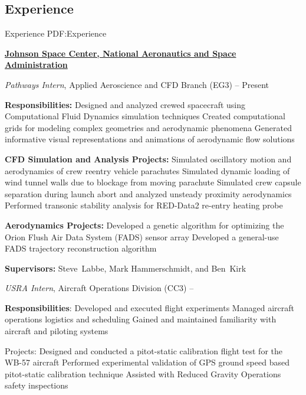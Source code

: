 \documentclass[letterpaper,MMMyyyy,nonstop]{simpleresumecv}
\begin{document}
\begin{body}
\section
{Experience}
{Experience}
{PDF:Experience}

\href{https://www.nasa.gov/centers/johnson/home/index.html}
{\textbf{Johnson Space Center,
National Aeronautics and Space Administration}}

\GapNoBreak
\BulletItem
\emph{Pathways Intern}, Applied Aeroscience and CFD Branch (EG3)
\hfill
{} --
Present
\begin{detail}
\SubItem
\textbf{Responsibilities:}
\SubBulletItem
Designed and analyzed crewed spacecraft using Computational Fluid Dynamics simulation techniques
\SubBulletItem
Created computational grids for modeling complex geometries and aerodynamic phenomena
\SubBulletItem
Generated informative visual representations and animations of aerodynamic flow solutions

\SubItem
\textbf{CFD Simulation and Analysis Projects:}
\SubBulletItem
Simulated oscillatory motion and aerodynamics of crew reentry vehicle parachutes
\SubBulletItem
Simulated dynamic loading of wind tunnel walls due to blockage from moving parachute
\SubBulletItem
Simulated crew capsule separation during launch abort and analyzed unsteady proximity aerodynamics
\SubBulletItem
Performed transonic stability analysis for RED-Data2 re-entry heating probe

\SubItem
\textbf{Aerodynamics Projects:}
\SubBulletItem
Developed a genetic algorithm for optimizing the Orion Flush Air Data System (FADS) sensor array
\SubBulletItem
Developed a general-use FADS trajectory reconstruction algorithm

\SubItem
\textbf{Supervisors:}
Steve~Labbe, Mark Hammerschmidt, and
Ben~Kirk
\end{detail}

\GapNoBreak
\BulletItem
\emph{USRA Intern}, Aircraft Operations Division (CC3)
\hfill
{} --
\begin{detail}
\SubItem
\textbf{Responsibilities}:
\SubBulletItem
Developed and executed flight experiments
\SubBulletItem
Managed aircraft operations logistics and scheduling
\SubBulletItem
Gained and maintained familiarity with aircraft and piloting systems

\SubItem
Projects:
\SubBulletItem
Designed and conducted a pitot-static calibration flight test for the WB-57 aircraft
\SubBulletItem
Performed experimental validation of GPS ground speed based pitot-static calibration technique
\SubBulletItem
Assisted with Reduced Gravity Operations safety inspections


\end{detail}
\end{body}
\end{document}
